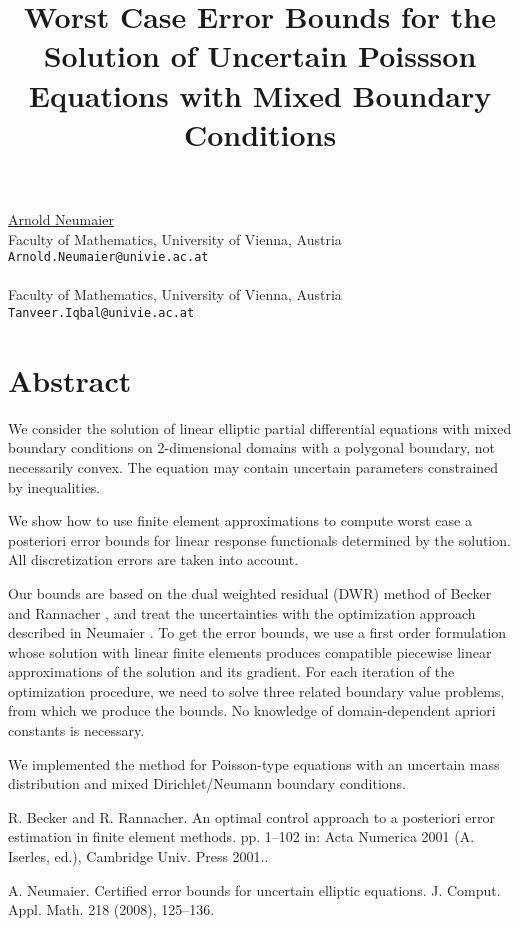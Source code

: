 \title{Worst Case Error Bounds for the Solution of Uncertain Poissson 
Equations with Mixed Boundary Conditions}
 \author{} \institute{}
\maketitle
\begin{center}
{\large \underline{Arnold Neumaier}}\\
Faculty of Mathematics, University of Vienna, Austria\\
{\tt Arnold.Neumaier@univie.ac.at}
\\ \vspace{4mm}{\large Tanveer Iqbal}\\
Faculty of Mathematics, University of Vienna, Austria\\
{\tt Tanveer.Iqbal@univie.ac.at}

\end{center}

\section*{Abstract}

We consider the solution of linear elliptic partial differential 
equations with mixed boundary conditions on 2-dimensional domains with 
a polygonal boundary, not necessarily convex. The equation may contain 
uncertain parameters constrained by inequalities.

We show how to use finite element approximations to compute worst case 
a posteriori error bounds for linear response functionals determined 
by the solution. All discretization errors are taken into account. 

Our bounds are based on the dual weighted residual (DWR) method of 
{\sc Becker and Rannacher} \cite{BecR}, and treat the uncertainties 
with the optimization approach described in {\sc Neumaier} \cite{Neu}. 
To get the error bounds, we use a first order formulation whose 
solution with linear finite elements produces compatible piecewise 
linear approximations of the solution and its gradient. For each 
iteration of the optimization procedure, we need to solve three related
boundary value problems, from which we produce the bounds. No knowledge 
of domain-dependent apriori constants is necessary.

We implemented the method for Poisson-type equations with an uncertain 
mass distribution and mixed Dirichlet/Neumann boundary conditions.



\begin{thebibliography}{10}

{\sc R. Becker and R. Rannacher}. {An optimal control approach to a posteriori error estimation in finite
element methods}. pp. 1--102 in:
Acta Numerica 2001 (A. Iserles, ed.), Cambridge Univ. Press 2001..



{\sc A. Neumaier}. {Certified error bounds for uncertain elliptic equations}. J. Comput. Appl. Math. 218 (2008), 125--136.

\end{thebibliography}
